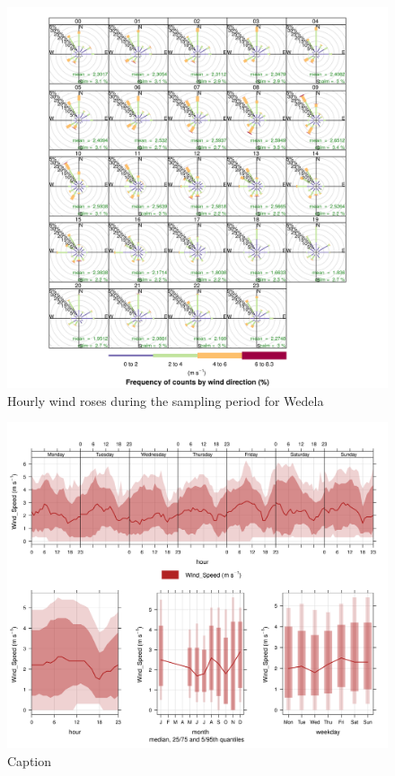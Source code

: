 \documentclass{nwureport}
\begin{document}
\begin{figure}[!htb]
    \centering
    \includegraphics[width=\textwidth]{images/Wedela-windrose-hourly.png}
    \caption[Hourly wind roses for Wedela]{Hourly wind roses during the sampling period for Wedela}
    \label{fig:windrose-hourly}
\end{figure}

\begin{figure}[!htb]
    \centering
    \includegraphics[width=\textwidth]{images/Wedela_Wind_Speed_timevary.png}
    \caption{Caption}
    \label{fig:summary}
\end{figure}
\end{document}

